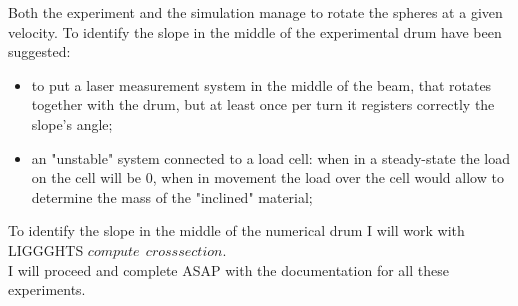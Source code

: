 Both the experiment and the simulation manage to rotate the spheres at a given velocity.
To identify the slope in the middle of the experimental drum have been suggested:
\begin{itemize}
\item{to put a laser measurement system in the middle of the beam, that rotates together with the drum, but at least once per turn it registers correctly the slope's angle;}
\item{an "unstable" system connected to a load cell: when in a steady-state the load on the cell will be $0$, when in movement the load over the cell would allow to determine the mass of the "inclined" material;}
\end{itemize}
To identify the slope in the middle of the numerical drum I will work with LIGGGHTS $compute ~~ crosssection$.\\

I will proceed and complete ASAP with the documentation for all these experiments.\\
